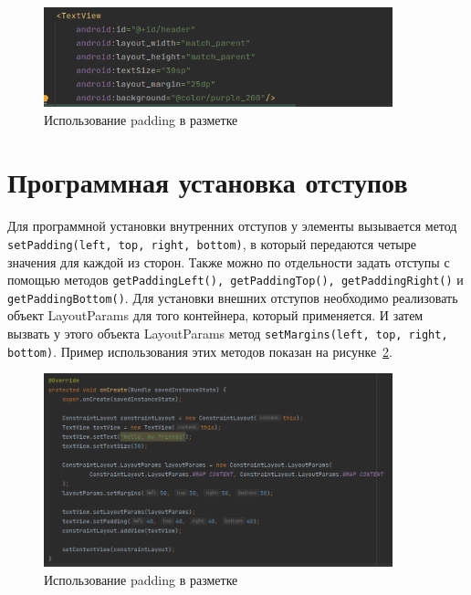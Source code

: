 \begin{figure}[h!tp]
	\centering
	\includegraphics[width=0.9\textwidth]{Screenshot from 2023-03-10 13-08-23.png}
	\caption{Использование padding в разметке}
	\label{fig:xml:margin}
\end{figure}

\section{Программная установка отступов}
Для программной установки внутренних отступов у элементы вызывается
метод \texttt{setPadding(left, top, right, bottom)},
в который передаются четыре значения для каждой из сторон.
Также можно по отдельности задать отступы с помощью методов
\texttt{getPaddingLeft(), getPaddingTop(), getPaddingRight()} и
\texttt{getPaddingBottom()}.
Для установки внешних отступов необходимо реализовать объект
LayoutParams для того контейнера, который применяется.
И затем вызвать у этого объекта LayoutParams метод
\texttt{setMargins(left, top, right, bottom)}.
Пример использования этих методов показан на рисунке~\ref{fig:java:pd:mrg}.

\begin{figure}[h!tp]
	\centering
	\includegraphics[width=0.9\textwidth]{Screenshot from 2023-03-10 13-16-40.png}
	\caption{Использование padding в разметке}
	\label{fig:java:pd:mrg}
\end{figure}

